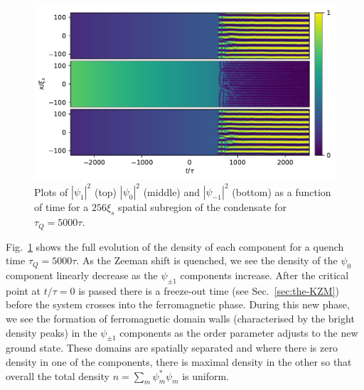 \begin{figure}[tb]
    \centering
    \includegraphics[width=\textwidth]{gfx/ch-spin1/BA-FM_all_densities.pdf}
    \caption{Plots of $|\psi_1|^2$ (top) $|\psi_0|^2$ (middle) and
    $|\psi_{-1}|^2$ (bottom) as a function of time for a $256\xi_s$
    spatial subregion of the condensate for $\tau_Q=5000\tau$.}
    \label{fig: BA-FM-densities}
\end{figure}
Fig.~\ref{fig: BA-FM-densities} shows the full evolution of the density of each
component for a quench time $\tau_Q=5000\tau$.
As the Zeeman shift is quenched, we see the density of the $\psi_0$ component
linearly decrease as the $\psi_{\pm 1}$ components increase.
After the critical point at $t/\tau=0$ is passed there is a freeze-out time
(see Sec.~\ref{sec:the-KZM}) before the system crosses into the ferromagnetic
phase.
During this new phase, we see the formation of ferromagnetic domain walls
(characterised by the bright density peaks) in the $\psi_{\pm 1}$ components as
the order parameter adjusts to the new ground state.
These domains are spatially separated and where there is zero density in one of
the components, there is maximal density in the other so that overall the total
density $n=\sum_m\psi_m^*\psi_m$ is uniform.


